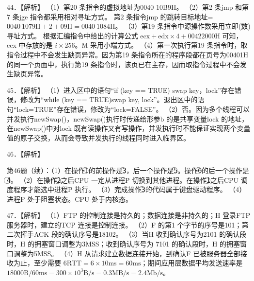 \documentclass[UTF8,11pt]{ctexart}
\begin{document}
44．【解析】 （1）第20 条指令的虚拟地址为0040 10B9H。 （2）第2 条jmp 和第7 条jge 指令都采用相对寻址方式。 第2 条指令jmp 的跳转目标地址=\(\displaystyle \mathrm{0040\ 1079H}+2+\mathrm{09H}=\mathrm{0040\ 1084H}\)。 （3）第19 条指令中源操作数采用立即(数)寻址方式。 根据汇编指令中给出的计算公式 \(\displaystyle \mathrm{ecx}+\mathrm{edx}\times4+\mathrm{00422000H}\) 可知，ecx 中存放的是 \(\displaystyle i\times256\)。M 采用小端方式。 （4）第一次执行第19 条指令时，取指令过程中不会发生缺页异常。因为第19 条指令所在的程序段都在页号为00401H 的同一个页面中，执行第19 条指令时，该页已在主存，因而取指令过程中不会发生缺页异常。


45．【解析】 （1）进入区中的语句“if (key == TRUE) swap key，lock”存在错误，修改为“while (key == TRUE)swap key, lock”。退出区中的语句“lock=TRUE”存在错误，修改为“lock=FALSE”。 （2）否。因为多个线程可以并发执行newSwap()，newSwap()执行时传递给形参b 的是共享变量lock 的地址，在newSwap()中对lock 既有读操作又有写操作，并发执行时不能保证实现两个变量值的原子交换，从而会导致并发执行的线程同时进入临界区。


46．【解析】


第46题（续）：（1）在操作\textcircled{1}的前操作是\textcircled{3}，后一个操作是\textcircled{5}。操作\textcircled{6}的后一个操作是\textcircled{4}。 （2）在操作\textcircled{2}之后CPU 一定从进程P 切换到其他进程。在操作\textcircled{1}之后CPU 调度程序才能选中进程P 执行。 （3）完成操作\textcircled{3}的代码属于键盘驱动程序。 （4）进程P 处于阻塞状态。CPU 处于内核态。


47．【解析】 （1）FTP 的控制连接是持久的；数据连接是非持久的；H 登录FTP 服务器时，建立的TCP 连接是控制连接。 （2）F 的第1 个字节的序号是101；第二次挥手ACK 段的确认序号是18102。 （3）当H 收到确认序号为2101 的确认段时，H 的拥塞窗口调整为3MSS；收到确认序号为 7101 的确认段时，H 的拥塞窗口调整为5MSS。 （4）H 从请求建立数据连接开始，到确认F 已被服务器全部接收为止，至少需要 \(\displaystyle 6\mathrm{RTT}=6\times10\mathrm{ms}=60\mathrm{ms}\)；期间应用层数据平均发送速率是\(\displaystyle 18000\mathrm{B}/60\mathrm{ms}=300\times10^3\mathrm{B/s}=0.3\mathrm{MB/s}=2.4\mathrm{Mb/s}\)。
\end{document}
